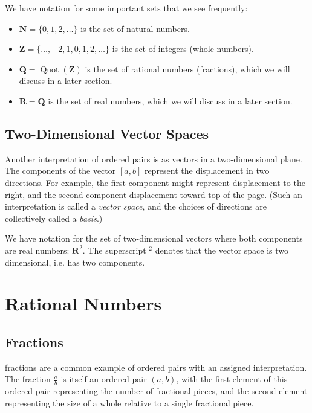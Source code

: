 \documentclass[a4paper,10pt]{report}
\begin{document}
We have notation for some important sets that we see frequently:

\begin{itemize}
  \item \(\mathbf{N} = \{0, 1, 2, \dots\}\) is the set of natural numbers.
  \item \(\mathbf{Z} = \{\dots, -2, 1, 0, 1, 2, \dots\}\) is the set of integers (whole
  numbers).
  \item \(\mathbf{Q} = \operatorname{Quot}(\mathbf{Z})\) is the set of rational numbers
  (fractions), which we will discuss in a later section.
  \item \(\mathbf{R} = \overline{\mathbf{Q}}\) is the set of real numbers, which we will
  discuss in a later section.
\end{itemize}

\section{Two-Dimensional Vector Spaces}

Another interpretation of ordered pairs is as vectors in a two-dimensional plane. The
components of the vector \([a, b]\) represent the displacement in two directions. For
example, the first component might represent displacement to the right, and the second
component displacement toward top of the page. (Such an interpretation is called a
\emph{vector space}, and the choices of directions are collectively called a \emph{basis}.)

We have notation for the set of two-dimensional vectors where both components are real
numbers: \(\mathbf{R}^2\). The superscript \(^2\) denotes that the vector space is two
dimensional, i.e. has two components.

\chapter{Rational Numbers}

\section{Fractions}

\Glspl{fraction} are a common example of ordered pairs with an assigned interpretation. The
fraction \(\frac{a}{b}\) is itself an ordered pair \((a, b)\), with the first element of
this ordered pair representing the number of fractional pieces, and the second element
representing the size of a whole relative to a single fractional piece.
\end{document}
